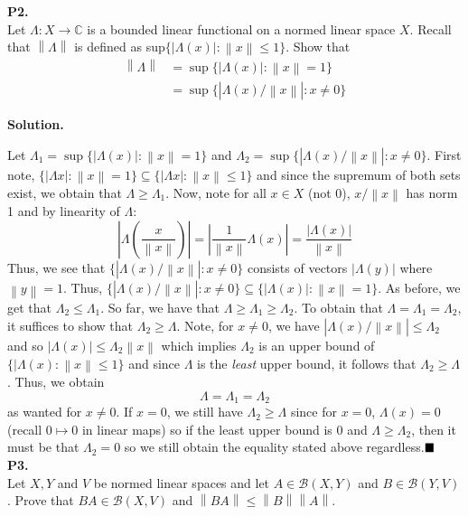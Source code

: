 \documentclass{article}
\newcommand{\norm}[1]{\left\lVert#1\right\rVert}
\begin{document}
    \textbf{P2.}\\

    Let $\Lambda:X\to\mathbb{C}$ is a bounded linear functional on a normed linear space $X$. Recall that $\norm{\Lambda}$ is defined
    as sup$\{|\Lambda(x)|: \norm{x}\leq 1\}$. Show that
    \begin{align*}
        \norm{\Lambda} &=\sup\{|\Lambda(x)|: \norm{x}=1\} \\
            &=\sup\{|\Lambda(x)/\norm{x}|: x\neq 0\}
    \end{align*}

    \textbf{Solution.}

    Let $\Lambda_1 = \sup\{|\Lambda(x)|:\norm{x}=1\}$ and $\Lambda_2 = \sup\{|\Lambda(x)/\norm{x}|:x\neq 0\}$. First note,
    $\{|\Lambda x|: \norm{x}=1\}\subseteq\{|\Lambda x|:\norm{x}\leq1\}$ and since the supremum of both sets exist, we obtain that
    $\Lambda\geq\Lambda_1$. Now, note for all $x\in X$ (not 0), $x/\norm{x}$ has norm 1 and by linearity of $\Lambda$:
    \[ |\Lambda(\frac{x}{\norm{x}})| = |\frac{1}{\norm{x}}\Lambda(x)| = \frac{|\Lambda(x)|}{\norm{x}} \]
    Thus, we see that $\{|\Lambda(x)/\norm{x}|:x\neq 0\}$ consists of vectors $|\Lambda(y)|$ where $\norm{y}=1$. Thus,
    $\{|\Lambda(x)/\norm{x}|:x\neq 0\}\subseteq\{|\Lambda(x)|:\norm{x}=1\}$. As before, we get that $\Lambda_2\leq\Lambda_1$.
    So far, we have that $\Lambda\geq\Lambda_1\geq\Lambda_2$. To obtain that $\Lambda = \Lambda_1 = \Lambda_2$, it suffices to show
    that $\Lambda_2\geq\Lambda$. Note, for $x\neq 0$, we have $|\Lambda(x)/\norm{x}|\leq\Lambda_2$ and so
    $|\Lambda(x)|\leq\Lambda_2\norm{x}$ which implies $\Lambda_2$ is an upper bound of $\{|\Lambda(x):\norm{x}\leq 1\}$ and
    since $\Lambda$ is the \textit{least} upper bound, it follows that $\Lambda_2\geq\Lambda$. Thus, we obtain
    \[ \Lambda = \Lambda_1 = \Lambda_2 \]
    as wanted for $x\neq 0$. If $x=0$, we still have $\Lambda_2\geq\Lambda$ since for $x=0$, $\Lambda(x)=0$ (recall $0\mapsto 0$
    in linear maps) so if the least upper bound is 0 and $\Lambda\geq\Lambda_2$, then it must be that $\Lambda_2 =0$ so we still
    obtain the equality stated above regardless.$\hfill\blacksquare$\\

    \textbf{P3.}\\

    Let $X,Y$ and $V$ be normed linear spaces and let $A\in\mathcal{B}(X,Y)$ and $B\in\mathcal{B}(Y,V)$. Prove that
    $BA\in\mathcal{B}(X,V)$ and $\norm{BA}\leq \norm{B}\norm{A}$.\\
\end{document}
